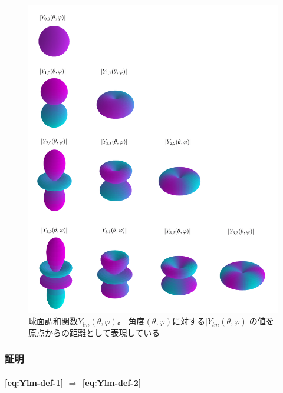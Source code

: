\documentclass[../main/main]{subfiles}
\begin{document}
\begin{figure}[tbp]
  \centering
  \includegraphics[width=120mm]{../fig/legendre/Ylm.png}
  \caption{球面調和関数$Y_{lm} (\theta, \varphi)$。
	角度$(\theta, \varphi)$に対する$|Y_{lm} (\theta, \varphi)|$の値を原点からの距離として表現している}
\end{figure}


\subsubsection*{証明}

\paragraph{\eqref{eq:Ylm-def-1} $\Longrightarrow$ \eqref{eq:Ylm-def-2}}
\end{document}
